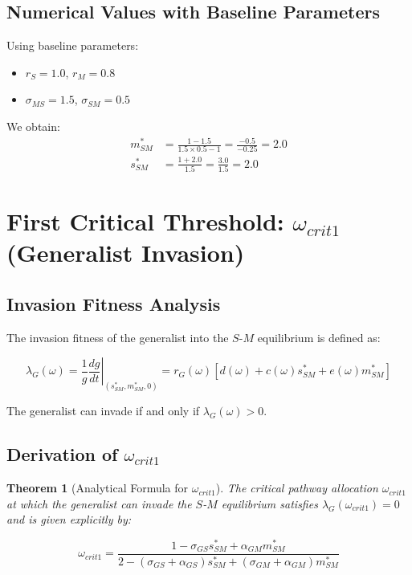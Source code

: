 \documentclass[11pt]{article}
\newtheorem{theorem}{Theorem}
\begin{document}
\subsection{Numerical Values with Baseline Parameters}

Using baseline parameters:
\begin{itemize}
    \item $r_S = 1.0$, $r_M = 0.8$
    \item $\sigma_{MS} = 1.5$, $\sigma_{SM} = 0.5$
\end{itemize}

We obtain:
\begin{align}
m^*_{SM} &= \frac{1 - 1.5}{1.5 \times 0.5 - 1} = \frac{-0.5}{-0.25} = 2.0 \\
s^*_{SM} &= \frac{1 + 2.0}{1.5} = \frac{3.0}{1.5} = 2.0
\end{align}

\section{First Critical Threshold: $\omega_{crit1}$ (Generalist Invasion)}

\subsection{Invasion Fitness Analysis}

The invasion fitness of the generalist into the $S$-$M$ equilibrium is defined as:

\begin{equation}
\lambda_G(\omega) = \left.\frac{1}{g}\frac{dg}{dt}\right|_{(s^*_{SM}, m^*_{SM}, 0)} = r_G(\omega) \left[d(\omega) + c(\omega) s^*_{SM} + e(\omega) m^*_{SM}\right]
\label{eq:lambda_G}
\end{equation}

The generalist can invade if and only if $\lambda_G(\omega) > 0$.

\subsection{Derivation of $\omega_{crit1}$}

\begin{theorem}[Analytical Formula for $\omega_{crit1}$]
The critical pathway allocation $\omega_{crit1}$ at which the generalist can invade the $S$-$M$ equilibrium satisfies $\lambda_G(\omega_{crit1}) = 0$ and is given explicitly by:

\begin{equation}
\boxed{\omega_{crit1} = \frac{1 - \sigma_{GS} s^*_{SM} + \alpha_{GM} m^*_{SM}}{2 - (\sigma_{GS} + \alpha_{GS}) s^*_{SM} + (\sigma_{GM} + \alpha_{GM}) m^*_{SM}}}
\label{eq:omega_crit1}
\end{equation}
\end{theorem}
\end{document}
